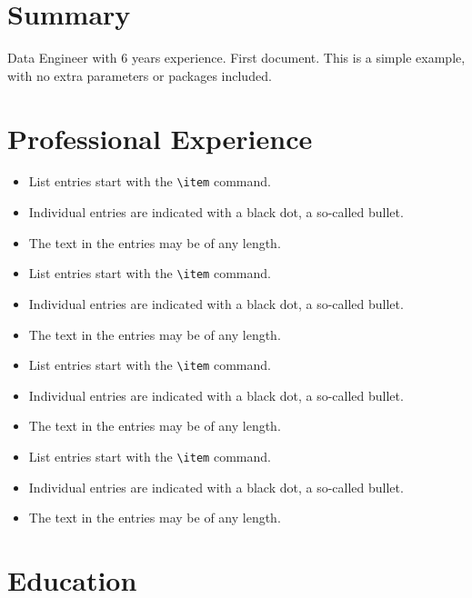\documentclass[11pt,a4paper]{resume}
\begin{document}
\section{Summary}
Data Engineer with 6 years experience. First document. This is a simple example, with no 
extra parameters or packages included.

\section{Professional Experience}

\begin{itemize}
  \item List entries start with the \verb|\item| command.
  \item Individual entries are indicated with a black dot, a so-called bullet.
  \item The text in the entries may be of any length.
  \item List entries start with the \verb|\item| command.
  \item Individual entries are indicated with a black dot, a so-called bullet.
  \item The text in the entries may be of any length.
\end{itemize}

\begin{itemize}
  \item List entries start with the \verb|\item| command.
  \item Individual entries are indicated with a black dot, a so-called bullet.
  \item The text in the entries may be of any length.
  \item List entries start with the \verb|\item| command.
  \item Individual entries are indicated with a black dot, a so-called bullet.
  \item The text in the entries may be of any length.
\end{itemize}

\section{Education}
\end{document}
